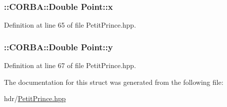 \subsubsection[{\texorpdfstring{x}{x}}]{\setlength{\rightskip}{0pt plus 5cm}\+::C\+O\+R\+B\+A\+::\+Double Point\+::x}\hypertarget{struct_point_a3af32dd2ea10a8184bedd984a831b295}{}\label{struct_point_a3af32dd2ea10a8184bedd984a831b295}


Definition at line 65 of file Petit\+Prince.\+hpp.

\subsubsection[{\texorpdfstring{y}{y}}]{\setlength{\rightskip}{0pt plus 5cm}\+::C\+O\+R\+B\+A\+::\+Double Point\+::y}\hypertarget{struct_point_a059294d7a3980780c3e2d6c74b4197fb}{}\label{struct_point_a059294d7a3980780c3e2d6c74b4197fb}


Definition at line 67 of file Petit\+Prince.\+hpp.



The documentation for this struct was generated from the following file\+:\begin{DoxyCompactItemize}
\item 
hdr/\hyperlink{_petit_prince_8hpp}{Petit\+Prince.\+hpp}\end{DoxyCompactItemize}
